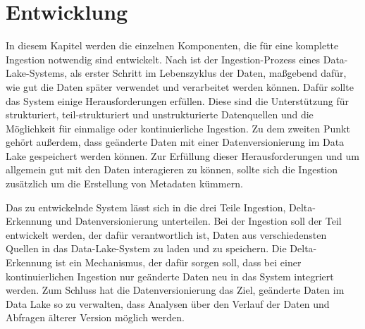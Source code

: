 \chapter{Entwicklung}
In diesem Kapitel werden die einzelnen Komponenten, die für eine komplette Ingestion notwendig sind entwickelt.
Nach \citeauthor{DL-Ing-Mgmt} ist der Ingestion-Prozess eines Data-Lake-Systems, als erster Schritt im Lebenszyklus der Daten, maßgebend dafür, wie gut die Daten später verwendet und verarbeitet werden können.
Dafür sollte das System einige Herausforderungen erfüllen.
Diese sind die Unterstützung für strukturiert, teil-strukturiert und unstrukturierte Datenquellen und die Möglichkeit für einmalige oder kontinuierliche Ingestion.
Zu dem zweiten Punkt gehört außerdem, dass geänderte Daten mit einer Datenversionierung im Data Lake gespeichert werden können.
Zur Erfüllung dieser Herausforderungen und um allgemein gut mit den Daten interagieren zu können, sollte sich die Ingestion zusätzlich um die Erstellung von Metadaten kümmern.

Das zu entwickelnde System lässt sich in die drei Teile Ingestion, Delta-Erkennung und Datenversionierung unterteilen.
Bei der Ingestion soll der Teil entwickelt werden, der dafür verantwortlich ist, Daten aus verschiedensten Quellen in das Data-Lake-System zu laden und zu speichern.
Die Delta-Erkennung ist ein Mechanismus, der dafür sorgen soll, dass bei einer kontinuierlichen Ingestion nur geänderte Daten neu in das System integriert werden.
Zum Schluss hat die Datenversionierung das Ziel, geänderte Daten im Data Lake so zu verwalten, dass Analysen über den Verlauf der Daten und Abfragen älterer Version möglich werden.





